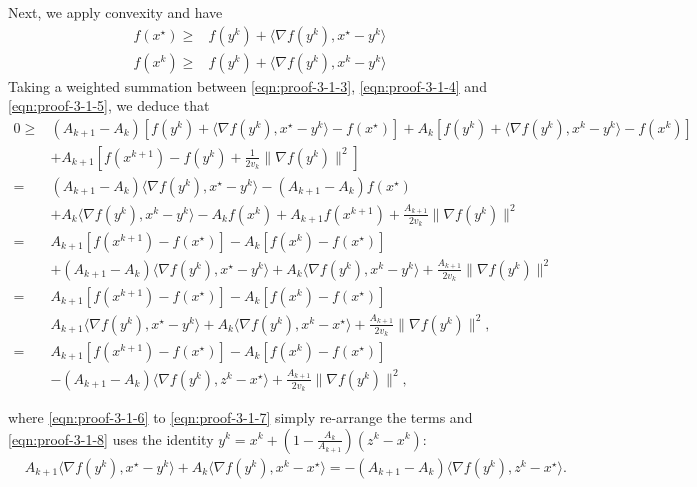 Next, we apply convexity and have
\begin{align}
  f (x^{\star}) \geq{} & f (y^k) + \langle \nabla f (y^k), x^{\star} - y^k
  \rangle \label{eqn:proof-3-1-4}\\
  f (x^k) \geq{} & f (y^k) + \langle \nabla f (y^k), x^k - y^k \rangle
  \label{eqn:proof-3-1-5}
\end{align}
Taking a weighted summation between \eqref{eqn:proof-3-1-3}, \eqref{eqn:proof-3-1-4} and \eqref{eqn:proof-3-1-5}, we deduce that
\begin{align}
  0 \geq{} & (A_{k + 1} - A_k) [f (y^k) + \langle \nabla f (y^k), x^{\star} -
  y^k \rangle - f (x^{\star})]  + A_k [f (y^k) + \langle \nabla f (y^k), x^k - y^k \rangle - f (x^k)]
  \nonumber\\
  & + A_{k + 1} [ f (x^{k + 1}) - f (y^k) + \tfrac{1}{2 v_k} \| \nabla f
  (y^k) \|^2 ] \nonumber\\
  ={} & (A_{k + 1} - A_k) \langle \nabla f (y^k), x^{\star} - y^k \rangle -
  (A_{k + 1} - A_k) f (x^{\star}) \nonumber\\
  & + A_k \langle \nabla f (y^k), x^k - y^k \rangle - A_k f (x^k) + A_{k + 1}
  f (x^{k + 1}) + \tfrac{A_{k + 1}}{2 v_k} \| \nabla f (y^k) \|^2 \label{eqn:proof-3-1-6} \\
  ={} & A_{k + 1} [f (x^{k + 1}) - f (x^{\star})] - A_k [f (x^k) - f
  (x^{\star})] \nonumber\\
  & + (A_{k + 1} - A_k) \langle \nabla f (y^k), x^{\star} - y^k \rangle + A_k
  \langle \nabla f (y^k), x^k - y^k \rangle + \tfrac{A_{k + 1}}{2 v_k} \|
  \nabla f (y^k) \|^2 \label{eqn:proof-3-1-7}\\
  ={} & A_{k + 1} [f (x^{k + 1}) - f (x^{\star})] - A_k [f (x^k) - f
  (x^{\star})] \nonumber\\
  & A_{k + 1} \langle \nabla f (y^k), x^{\star} - y^k \rangle + A_k \langle
  \nabla f (y^k), x^k - x^{\star} \rangle + \tfrac{A_{k + 1}}{2 v_k} \| \nabla
  f (y^k) \|^2, \nonumber\\
  ={} & A_{k + 1} [f (x^{k + 1}) - f (x^{\star})] - A_k [f (x^k) - f
  (x^{\star})] \nonumber\\ 
  &- (A_{k + 1} - A_k) \langle \nabla f (y^k), z^k - x^{\star} \rangle + \tfrac{A_{k + 1}}{2 v_k} \| \nabla
  f (y^k) \|^2, \label{eqn:proof-3-1-8}
\end{align}

where \eqref{eqn:proof-3-1-6} to \eqref{eqn:proof-3-1-7} simply re-arrange the terms and \eqref{eqn:proof-3-1-8} uses the identity $y^k = x^k + ( 1 - \tfrac{A_k}{A_{k + 1}} ) (z^k - x^k)$:
\begin{align}
  & A_{k + 1} \langle \nabla f (y^k), x^{\star} - y^k \rangle + A_k \langle
  \nabla f (y^k), x^k - x^{\star} \rangle 
  =  - (A_{k + 1} - A_k) \langle \nabla f (y^k), z^k - x^{\star} \rangle .
  \nonumber
\end{align}

